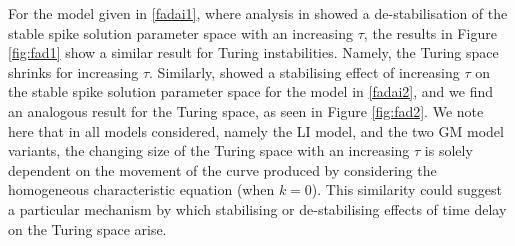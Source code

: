 For the model given in \eqref{fadai1}, where analysis in \cite{fadai1} showed a de-stabilisation of the stable spike solution parameter space with an increasing $\tau$, the results in Figure \ref{fig:fad1} show a similar result for Turing instabilities. Namely, the Turing space shrinks for increasing $\tau$. Similarly, \cite{fadai2} showed a stabilising effect of increasing $\tau$ on the stable spike solution parameter space for the model in \eqref{fadai2}, and we find an analogous result for the Turing space, as seen in Figure \ref{fig:fad2}. We note here that in all models considered, namely the LI model, and the two GM model variants, the changing size of the Turing space with an increasing $\tau$ is solely dependent on the movement of the curve produced by considering the homogeneous characteristic equation (when $k=0$). This similarity could suggest a particular mechanism by which stabilising or de-stabilising effects of time delay on the Turing space arise.


